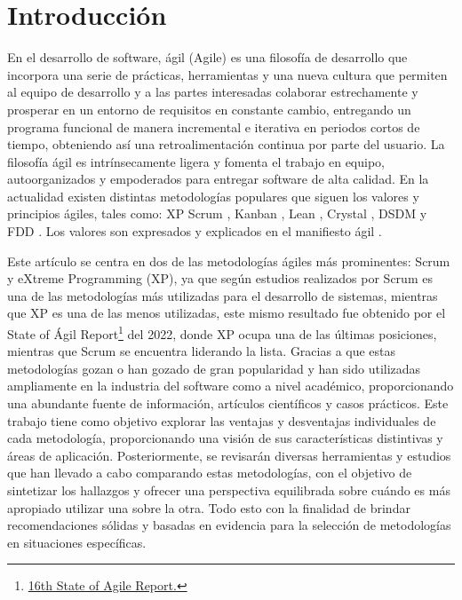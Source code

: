 \documentclass[a4paper,10pt]{article}
\begin{document}
	\section{Introducción}
	En el desarrollo de software, ágil (Agile) es una filosofía de desarrollo que incorpora una serie de prácticas, herramientas y una nueva cultura que permiten al equipo de desarrollo y a las partes interesadas colaborar estrechamente y prosperar en un entorno de requisitos en constante cambio, entregando un programa funcional de manera incremental e iterativa en periodos cortos de tiempo, obteniendo así una retroalimentación continua por parte del usuario. La filosofía ágil es intrínsecamente ligera y fomenta el trabajo en equipo, autoorganizados y empoderados para entregar software de alta calidad. En la actualidad existen distintas metodologías populares que siguen los valores y principios ágiles, tales como: XP \parencite{Beck_Andres_2005} Scrum \parencite{sutherland2014scrum}, Kanban \parencite{anderson2010kanban}, Lean \parencite{poppendieck2003lean}, Crystal \parencite{cockburn2004crystal}, DSDM \parencite{stapleton1997dynamic} y FDD \parencite{palmer2001practical}. Los valores son expresados y explicados en el manifiesto ágil \parencite{Manifesto_for_Agile_Software_Development}.
	
	Este artículo se centra en dos de las metodologías ágiles más prominentes: Scrum y eXtreme Programming (XP), ya que según estudios realizados por \textcite{fuior2019key} Scrum es una de las metodologías más utilizadas para el desarrollo de sistemas, mientras que XP es una de las menos utilizadas, este mismo resultado fue obtenido por el State of Ágil Report\footnote{\href{https://info.digital.ai/rs/981-LQX-968/images/SOA16.pdf}{16th State of Agile Report.}} del 2022, donde XP ocupa una de las últimas posiciones, mientras que Scrum se encuentra liderando la lista. Gracias a que estas metodologías gozan o han gozado de gran popularidad y han sido utilizadas ampliamente en la industria del software como a nivel académico, proporcionando una abundante fuente de información, artículos científicos y casos prácticos. Este trabajo tiene como objetivo explorar las ventajas y desventajas individuales de cada metodología, proporcionando una visión de sus características distintivas y áreas de aplicación. Posteriormente, se revisarán diversas herramientas y estudios que han llevado a cabo comparando estas metodologías, con el objetivo de sintetizar los hallazgos y ofrecer una perspectiva equilibrada sobre cuándo es más apropiado utilizar una sobre la otra. Todo esto con la finalidad de brindar recomendaciones sólidas y basadas en evidencia para la selección de metodologías en situaciones específicas.
\end{document}
